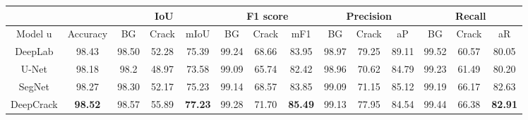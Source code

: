 \documentclass[a4paper,12pt]{report}
\begin{document}
\begin{table}[htbp]
    \begin{adjustbox}{width=\columnwidth,center}
        \begin{tabular}{|c|c|c|c|c|c|c|c|c|c|c|c|c|c|}
            \hline
                                                              &                & \multicolumn{3}{|c|}{\textbf{IoU}} & \multicolumn{3}{|c|}{\textbf{F1 score}} & \multicolumn{3}{|c|}{\textbf{Precision}} & \multicolumn{3}{|c|}{\textbf{Recall}}                                                                                                      \\
            \hline
            {Model}                               u           & {Accuracy}     & {BG}                               & {Crack}                                 & {mIoU}                                   & {BG}                                  & {Crack} & {mF1}          & {BG}    & {Crack} & {aP}           & {BG}    & {Crack} & {aR}           \\
            \hline
            {DeepLab \cite{chen_encoder-decoder_2018}}        & {98.43}        & {98.50}                            & {52.28}                                 & {75.39}                                  & {99.24}                               & {68.66} & {83.95}        & {98.97} & {79.25} & {89.11}        & {99.52} & {60.57} & {80.05}        \\
            \hline
            {U-Net \cite{}}                                   & {98.18}        & {98.2}                             & {48.97}                                 & {73.58}                                  & {99.09}                               & {65.74} & {82.42}        & {98.96} & {70.62} & {84.79}        & {99.23} & {61.49} & {80.20}        \\
            \hline
            {SegNet\cite{chen_pavement_2020}}                 & {98.27}        & {98.30}                            & {52.17}                                 & {75.23}                                  & {99.14}                               & {68.57} & {83.85}        & {99.09} & {71.15} & {85.12}        & {99.19} & {66.17} & {82.63}        \\
            \hline
            {DeepCrack\cite{liu_deepcrack_2019}}              & \textbf{98.52} & {98.57}                            & {55.89}                                 & \textbf{77.23}                           & {99.28}                               & {71.70} & \textbf{85.49} & {99.13} & {77.95} & {84.54}        & {99.44} & {66.38} & \textbf{82.91} \\

\end{tabular}
\end{adjustbox}
\end{table}
\end{document}
